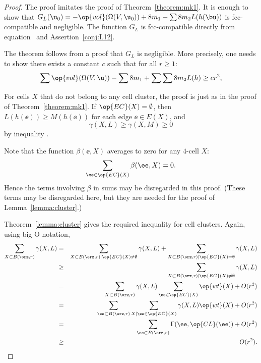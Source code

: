 \begin{proof} The proof imitates the proof of
Theorem~\ref{theorem:mk1}.  It is enough to show that $G_L( \u_0) =
-\op{vol}(\Omega(V, \u_0)) + 8 m_1 - \sum 8 m_2 L(h(\bu))$ is
fcc-compatible and negligible.  The function $G_L$ is fcc-compatible
directly from equation~ and Assertion~\ref{conj:L12}.

The theorem follows from a proof that $G_L$ is negligible.  More
precisely, one needs to show there exists a constant $c$ such that
for all $r\ge 1$:%
\begin{equation}\label{eqn:A2neg} 
\sum \op{vol}(\Omega(V, \u)) -\sum 8m_1 + \sum \sum 8 m_2 L(h) \ge c r^2,
\end{equation}

For cells $X$ that do not belong to any cell cluster,
the proof is just as in the proof of Theorem~\ref{theorem:mk1}.
If $\op{EC}(X)=\emptyset$, then 
$L(h(\ee))\ge M(h(\ee))$ for each edge $\ee\in E(X)$, and
\begin{displaymath}\gamma(X,L)\ge \gamma(X,M)\ge 0\end{displaymath} 
by inequality .

Note that the function $\beta(\ee,X)$ averages to zero for any $4$-cell $X$:
\begin{displaymath} 
\sum_{\ee\in \op{EC}(X)} \beta(\ee,X) = 0.
\end{displaymath}
Hence the terms involving $\beta$ in sums may be disregarded in this proof.
(These terms may be disregarded here, but they are
needed for the proof of Lemma~\ref{lemma:cluster}.)

Theorem~\ref{lemma:cluster} gives the required inequality for cell
clusters.  Again, using big O notation,
\begin{eqnarray*} 
\sum_{X\subset B(\orz,r)} \gamma(X,L) &=&
\sum_{X\subset B(\orz,r)\mid \op{EC}(X)\ne\emptyset} \gamma(X,L) +
\sum_{X\subset B(\orz,r)\mid \op{EC}(X)=\emptyset} \gamma(X,L) \vspace{6pt}\\
&\ge& \sum_{X\subset B(\orz,r)\mid \op{EC}(X)\ne\emptyset} \gamma(X,L)\vspace{6pt} \\
&=&\sum_{X\subset B(\orz,r)}\gamma(X,L)\sum_{\ee \in \op{EC}(X)}\op{wt}(X) + O(r^2)\vspace{6pt}\\
&=&\sum_{\ee\subset B(\orz,r)}\sum_{X\mid \ee \in \op{EC}(X)}\gamma(X,L)\op{wt}(X) + O(r^2)\vspace{6pt}\\
&=&\sum_{\ee\subset B(\orz,r)}\Gamma(\ee,\op{CL}(\ee)) + O(r^2)\vspace{6pt}\\
&\ge& ~~O(r^2).
\end{eqnarray*}



\end{proof}
